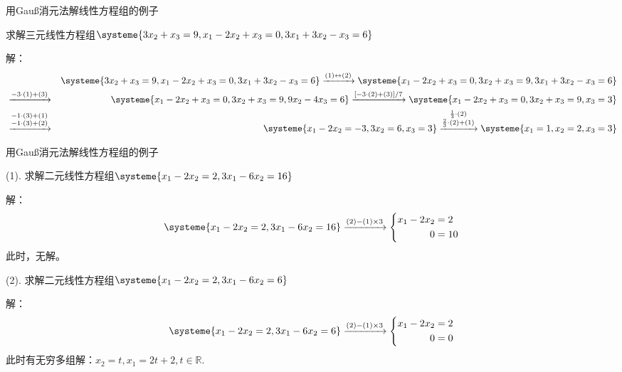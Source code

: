 
\begin{frame}{用Gau{\ss}消元法解线性方程组的例子}

求解三元线性方程组$\systeme{3x_2 + x_3 = 9, x_1 - 2x_2 + x_3 = 0 , 3x_1 + 3x_2 - x_3 = 6}$

\pause

解：
{\scriptsize
\begin{eqnarray*}
& & \systeme{3x_2 + x_3 = 9 , x_1 - 2x_2 + x_3 = 0 , 3x_1 + 3x_2 - x_3 = 6} \xrightarrow{(1)\leftrightarrow(2)} \systeme{x_1 - 2x_2 + x_3 = 0 , 3x_2 + x_3 = 9 , 3x_1 + 3x_2 - x_3 = 6} \\
& \xrightarrow{-3\cdot(1) + (3)} & \systeme{x_1 - 2x_2 + x_3 = 0, 3x_2 + x_3 = 9,  9x_2 - 4x_3 = 6} \xrightarrow{[-3\cdot(2)+(3)]/7} \systeme{x_1 - 2x_2 + x_3 = 0 , 3x_2 + x_3 = 9 , x_3 = 3} \\ & \xrightarrow{\substack{-1\cdot(3)+(1) \\ -1\cdot(3)+(2)}} & \systeme{x_1 - 2x_2 = -3 , 3x_2 = 6, x_3 = 3} \xrightarrow{\substack{\frac13\cdot(2) \\ \frac23\cdot(2)+(1)}} \systeme{x_1 = 1, x_2 = 2, x_3 = 3}
\end{eqnarray*}
}

\end{frame}


\begin{frame}{用Gau{\ss}消元法解线性方程组的例子}

(1). 求解二元线性方程组$\systeme{x_1 - 2x_2 = 2, 3x_1 - 6x_2 = 16}$

\pause

解：
$$\systeme{x_1 - 2x_2 = 2, 3x_1 - 6x_2 = 16} \xrightarrow{(2)-(1)\times 3} \left\{\begin{aligned}
x_1 - 2x_2 & = 2 \\ 0 & = 10
\end{aligned}\right.$$
此时，无解。

\pause

(2). 求解二元线性方程组$\systeme{x_1 - 2x_2 = 2, 3x_1 - 6x_2 = 6}$

\pause

解：
$$\systeme{x_1 - 2x_2 = 2, 3x_1 - 6x_2 = 6} \xrightarrow{(2)-(1)\times 3} \left\{\begin{aligned}
x_1 - 2x_2 & = 2 \\ 0 & = 0
\end{aligned}\right.$$
此时有无穷多组解：$x_2 = t, x_1 = 2t+2, t\in\mathbb{R}.$

\end{frame}

